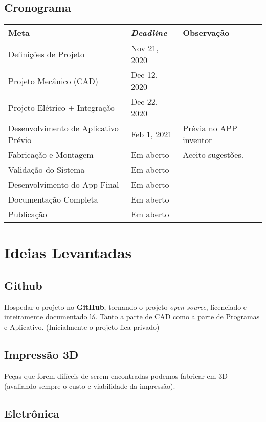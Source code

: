 \documentclass[a4paper, 12pt]{article}
\begin{document}
\subsection{Cronograma}

\begin{table}[htb]
	\begin{tabular}{l|l|l}
	
Meta & \textit{Deadline} & Observação \\ \hline\hline
Definições de Projeto &	Nov 21, 2020&	\\\hline
Projeto Mecânico (CAD)&	Dec 12, 2020	&\\\hline
Projeto Elétrico + Integração&	Dec 22, 2020&	\\\hline
Desenvolvimento de Aplicativo Prévio&	Feb 1, 2021&	Prévia no APP inventor\\\hline
Fabricação e Montagem& Em aberto & Aceito sugestões. \\\hline
Validação do Sistema&		Em aberto&\\\hline
Desenvolvimento do App Final&		Em aberto&\\\hline
Documentação Completa&		Em aberto&\\\hline
Publicação&	Em aberto&\\

\end{tabular}
\end{table}


\section{Ideias Levantadas}


\subsection{Github}

Hospedar o projeto no \textbf{GitHub}, tornando o projeto \textit{open-source}, licenciado e inteiramente documentado lá. Tanto a parte de CAD como a parte de Programas e Aplicativo. (Inicialmente o projeto fica privado)

\subsection{Impressão 3D}

Peças que forem difíceis de serem encontradas podemos fabricar em 3D (avaliando sempre o custo e viabilidade da impressão). 

\subsection{Eletrônica}
\end{document}
